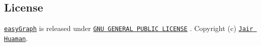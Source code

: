 \subsection*{License}

\href{https://github.com/JairFrancesco/easyGraph}{\tt easy\+Graph} is released under \href{https://github.com/JairFrancesco/easyGraph/blob/master/LICENSE}{\tt G\+NU G\+E\+N\+E\+R\+AL P\+U\+B\+L\+IC L\+I\+C\+E\+N\+SE} . Copyright (c) \href{https://sites.google.com/site/jafrahuamancanqui/}{\tt Jair Huaman}. 